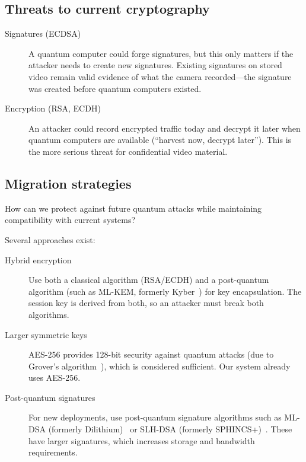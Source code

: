 \subsection{Threats to current cryptography}

\begin{description}
  \item[Signatures (ECDSA)] A quantum computer could forge signatures, but this 
    only matters if the attacker needs to create new signatures.
    Existing signatures on stored video remain valid evidence of what the 
    camera recorded---the signature was created before quantum computers 
    existed.
  \item[Encryption (RSA, ECDH)] An attacker could record encrypted traffic 
    today and decrypt it later when quantum computers are available 
    (\enquote{harvest now, decrypt later}).
    This is the more serious threat for confidential video material.
\end{description}

\subsection{Migration strategies}

\begin{exercise}
  How can we protect against future quantum attacks while maintaining 
  compatibility with current systems?
\end{exercise}

Several approaches exist:
\begin{description}
  \item[Hybrid encryption] Use both a classical algorithm (RSA/ECDH) and a
    post-quantum algorithm (such as ML-KEM, formerly
    Kyber~\autocite{FIPS203}) for key encapsulation.
    The session key is derived from both, so an attacker must break both 
    algorithms.
  \item[Larger symmetric keys] AES-256 provides 128-bit security against
    quantum attacks (due to Grover's algorithm~\autocite{Grover1996}),
    which is considered sufficient.
    Our system already uses AES-256.
  \item[Post-quantum signatures] For new deployments, use post-quantum
    signature algorithms such as ML-DSA (formerly
    Dilithium)~\autocite{FIPS204} or SLH-DSA (formerly
    SPHINCS+)~\autocite{FIPS205}.
    These have larger signatures, which increases storage and bandwidth 
    requirements.
\end{description}

